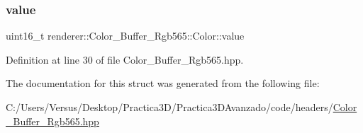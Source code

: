 \subsubsection{\texorpdfstring{value}{value}}
{\footnotesize\ttfamily uint16\+\_\+t renderer\+::\+Color\+\_\+\+Buffer\+\_\+\+Rgb565\+::\+Color\+::value}



Definition at line 30 of file Color\+\_\+\+Buffer\+\_\+\+Rgb565.\+hpp.



The documentation for this struct was generated from the following file\+:\begin{DoxyCompactItemize}
\item 
C\+:/\+Users/\+Versus/\+Desktop/\+Practica3\+D/\+Practica3\+D\+Avanzado/code/headers/\mbox{\hyperlink{_color___buffer___rgb565_8hpp}{Color\+\_\+\+Buffer\+\_\+\+Rgb565.\+hpp}}\end{DoxyCompactItemize}
